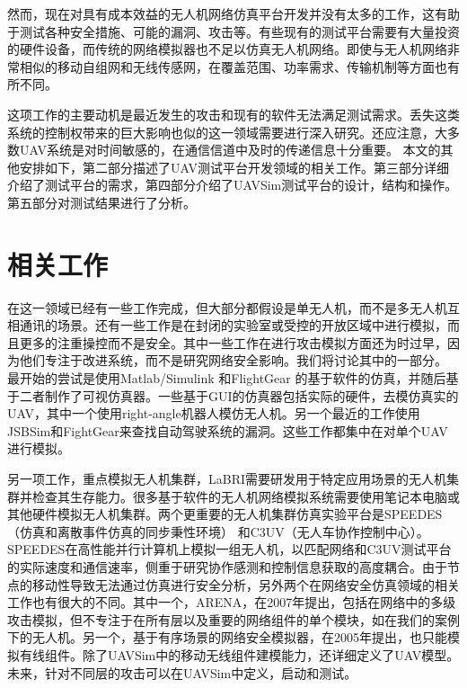 \documentclass[bachelor,fontset=fandol,AutoFakeBold=true]{nuaathesis}
\begin{document}
然而，现在对具有成本效益的无人机网络仿真平台开发并没有太多的工作，这有助于测试各种安全措施、可能的漏洞、攻击等。有些现有的测试平台需要有大量投资的硬件设备，而传统的网络模拟器也不足以仿真无人机网络。即使与无人机网络非常相似的移动自组网和无线传感网，在覆盖范围、功率需求、传输机制等方面也有所不同\cite{6javaid2012cyber}。

这项工作的主要动机是最近发生的攻击和现有的软件无法满足测试需求。丢失这类系统的控制权带来的巨大影响也似的这一领域需要进行深入研究。还应注意，大多数UAV系统是对时间敏感的，在通信信道中及时的传递信息十分重要。
本文的其他安排如下，第二部分描述了UAV测试平台开发领域的相关工作。第三部分详细介绍了测试平台的需求，第四部分介绍了UAVSim测试平台的设计，结构和操作。第五部分对测试结果进行了分析。

\chapter{相关工作}
在这一领域已经有一些工作完成，但大部分都假设是单无人机，而不是多无人机互相通讯的场景。还有一些工作是在封闭的实验室或受控的开放区域中进行模拟，而且更多的注重操控而不是安全。其中一些工作在进行攻击模拟方面还为时过早，因为他们专注于改进系统，而不是研究网络安全影响。我们将讨论其中的一部分。
最开始的尝试是使用Matlab/Simulink \cite{7lu2011real} 和FlightGear \cite{8jingsha2012uav} 的基于软件的仿真，并随后基于二者制作了可视仿真器\cite{9yin2011visual}。一些基于GUI的仿真器包括实际的硬件，去模仿真实的UAV\cite{10wu2011research}，其中一个使用right-angle机器人模仿无人机\cite{11yang2012uav}。另一个最近的工作使用JSBSim和FightGear来查找自动驾驶系统的漏洞\cite{12kim2012cyber}。这些工作都集中在对单个UAV进行模拟。

另一项工作，重点模拟无人机集群，LaBRI需要研发用于特定应用场景的无人机集群并检查其生存能力\cite{13brown2004test}。很多基于软件的无人机网络模拟系统需要使用笔记本电脑或其他硬件模拟无人机集群\cite{14corner2004parallel}\cite{15hamilton2007validating}。两个更重要的无人机集群仿真实验平台是SPEEDES（仿真和离散事件仿真的同步秉性环境）\cite{16chaumette2011scual} 和C3UV（无人车协作控制中心）\cite{17pereira2013c3uv}。SPEEDES在高性能并行计算机上模拟一组无人机，以匹配网络和C3UV测试平台的实际速度和通信速率，侧重于研究协作感测和控制信息获取的高度耦合。由于节点的移动性导致无法通过仿真进行安全分析，另外两个在网络安全仿真领域的相关工作也有很大的不同。其中一个，ARENA，在2007年提出，包括在网络中的多级攻击模拟，但不专注于在所有层以及重要的网络组件的单个模块\cite{18kuhl2007cyber}，如在我们的案例下的无人机。另一个，基于有序场景的网络安全模拟器，在2005年提出，也只能模拟有线组件\cite{19yun2004scalable}。除了UAVSim中的移动无线组件建模能力，还详细定义了UAV模型。未来，针对不同层的攻击可以在UAVSim中定义，启动和测试。
\end{document}
